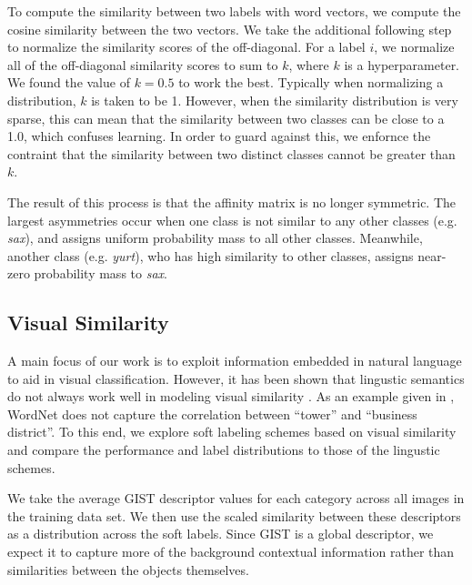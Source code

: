 To compute the similarity between two labels with word vectors, we compute the
cosine similarity between the two vectors. We take the additional following step
to normalize the similarity scores of the off-diagonal. For a label $i$, we
normalize all of the off-diagonal similarity scores to sum to $k$, where $k$ is
a hyperparameter. We found the value of $k = 0.5$ to work the best. Typically
when normalizing a distribution, $k$ is taken to be 1. However, when the
similarity distribution is very sparse, this can mean that the similarity
between two classes can be close to a 1.0, which confuses learning. In order to
guard against this, we enfornce the contraint that the similarity between two
distinct classes cannot be greater than $k$.

The result of this process is that the affinity matrix is no longer symmetric.
The largest asymmetries occur when one class is not similar to any other classes
(e.g. \emph{sax}), and assigns uniform probability mass to all other classes.
Meanwhile, another class (e.g. \emph{yurt}), who has high similarity to other
classes, assigns near-zero probability mass to \emph{sax}.

\subsection{Visual Similarity}

A main focus of our work is to exploit information embedded in natural language
to aid in visual classification.  However, it has been shown that lingustic
semantics do not always work well in modeling visual similarity
\cite{li2010building}. As an example given in \cite{li2010building}, WordNet
does not capture the correlation between ``tower'' and ``business district''.
To this end, we explore soft labeling schemes based on visual similarity
and compare the performance and label distributions to those of the lingustic
schemes.


We take the average GIST descriptor \cite{oliva2001modeling} values for each
category across all images in the training data set. We then use the scaled
similarity between these descriptors as a distribution across the soft labels.
Since GIST is a global descriptor, we expect it to capture more of the
background contextual information rather than similarities between the objects
themselves.


